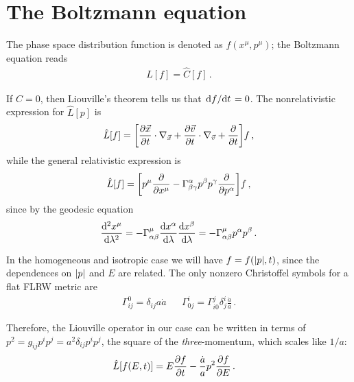 \documentclass[main.tex]{subfiles}
\begin{document}
\section{The Boltzmann equation}


The phase space distribution function is denoted as \(f(x^{\mu }, p^{\mu })\); the Boltzmann equation reads 
%
\begin{align}
\hat{L}[f] = \hat{C}[f] 
\,.
\end{align}

If \(\hat{C} = 0\), then Liouville's theorem tells us that \(\dv*{f}{t} = 0\). 
The nonrelativistic expression for \(\hat{L}[p]\) is 
%
\begin{align}
\hat{L}[f] = \qty[ \pdv{\vec{x}}{t} \cdot \nabla_{\vec{x}} + \pdv{\vec{v}}{t} \cdot \nabla_{\vec{v}} + \pdv{}{t}]f
\,,
\end{align}
%
while the general relativistic expression is 
%
\begin{align}
\hat{L}[f] = \qty[p^{\mu } \pdv{}{x^{\mu }} - \Gamma^{\alpha }_{\beta \gamma } p^{\beta } p^{\gamma } \pdv{}{p^{\alpha }}]f
\,,
\end{align}
%
since by the geodesic equation 
%
\begin{align}
\dv[2]{x^{\mu }}{\lambda} 
= - \Gamma^{\mu}_{\alpha \beta } \dv{x^{\alpha }}{\lambda } \dv{x^{\beta }}{\lambda }  
= - \Gamma^{\mu }_{\alpha \beta } p^{\alpha } p^{\beta }
\,.
\end{align}

In the homogeneous and isotropic case we will have \(f = f (\abs{p}, t)\), since the dependences on \(\abs{p}\) and \(E\) are related. 
The only nonzero Christoffel symbols for a flat FLRW metric are 
%
\begin{align}
\Gamma^{0}_{ij} = \delta_{ij} a \dot{a} && \Gamma^{i}_{0j} = \Gamma^{j}_{i0} \delta^{i}_{j} \frac{\dot{a}}{a}
\,.
\end{align}

Therefore, the Liouville operator in our case can be written in terms of \(p^2 = g_{ij} p^{i}p^{j} = a^2 \delta_{ij} p^{i} p^{j}\), the square of the \emph{three}-momentum, which scales like \(1/a\):
%
\begin{align}
\hat{L}[f(E, t)] &= E \pdv{f}{t} - \frac{\dot{a}}{a} p^2 \pdv{f}{E}   
\,.
\end{align}
\end{document}
